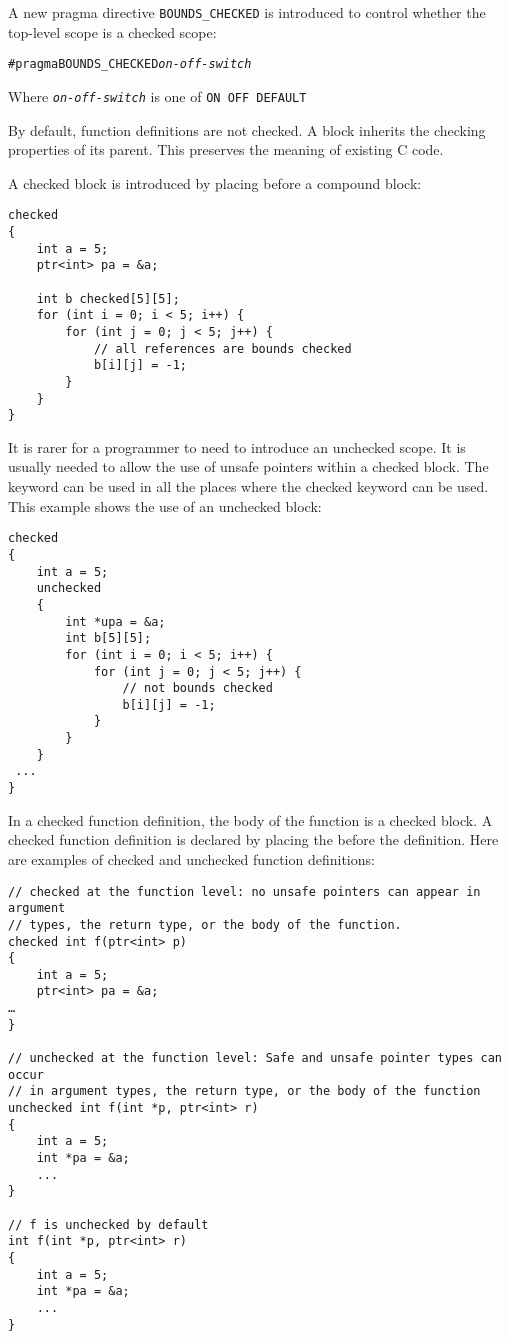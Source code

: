 A new pragma directive \texttt{BOUNDS\_CHECKED} is introduced to control whether
the top-level scope is a checked scope:
\begin{alltt}
#pragma BOUNDS_CHECKED \textit{on-off-switch}
\end{alltt}

Where \texttt{\textit{on-off-switch}} is one of \verb|ON OFF DEFAULT|

By default, function definitions are not checked. A block inherits the
checking properties of its parent. This preserves the meaning of
existing C code.

A checked block is introduced by placing   before a
compound block:
\begin{verbatim}
checked 
{
    int a = 5;
    ptr<int> pa = &a;

    int b checked[5][5];
    for (int i = 0; i < 5; i++) {
        for (int j = 0; j < 5; j++) {
            // all references are bounds checked
            b[i][j] = -1;
        }
    }
}
\end{verbatim}

It is rarer for a programmer to need to introduce an unchecked scope. It
is usually needed to allow the use of unsafe pointers within a checked
block. The  keyword can be used in all the places where the
checked keyword can be used. This example shows the use of an unchecked
block:

\begin{verbatim}
checked 
{
    int a = 5;
    unchecked 
    {
        int *upa = &a;	
        int b[5][5];
        for (int i = 0; i < 5; i++) {
            for (int j = 0; j < 5; j++) {
                // not bounds checked
                b[i][j] = -1;
            }
        }     
    }
 ...
}
\end{verbatim}

In a checked function definition, the body of the function is a 
checked  block. A checked function definition is declared by placing the
 before the definition. Here are examples of checked and
unchecked function definitions:

\begin{verbatim}
// checked at the function level: no unsafe pointers can appear in argument
// types, the return type, or the body of the function.
checked int f(ptr<int> p) 
{
    int a = 5;
    ptr<int> pa = &a;
…
}

// unchecked at the function level: Safe and unsafe pointer types can occur 
// in argument types, the return type, or the body of the function
unchecked int f(int *p, ptr<int> r)
{
    int a = 5;
    int *pa = &a;
    ...
}

// f is unchecked by default
int f(int *p, ptr<int> r)
{
    int a = 5;
    int *pa = &a;
    ...
}
\end{verbatim}

